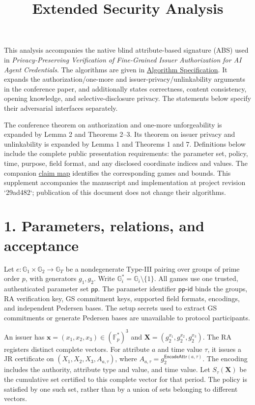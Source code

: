 \documentclass[11pt]{article}
\title{Extended Security Analysis}
\author{}
\date{}
\begin{document}
\maketitle


This analysis accompanies the native blind attribute-based signature (ABS) used in \emph{Privacy-Preserving Verification of Fine-Grained Issuer Authorization for AI Agent Credentials}. The algorithms are given in \href{algorithm-specification.md}{Algorithm Specification}. It expands the authorization/one-more and issuer-privacy/unlinkability arguments in the conference paper, and additionally states correctness, content consistency, opening knowledge, and selective-disclosure privacy. The statements below specify their adversarial interfaces separately.

The conference theorem on authorization and one-more unforgeability is expanded by Lemma 2 and Theorems 2–3. Its theorem on issuer privacy and unlinkability is expanded by Lemma 1 and Theorems 1 and 7. Definitions below include the complete public presentation requirements: the parameter set, policy, time, purpose, field format, and any disclosed coordinate indices and values. The companion \href{security-claim-map.md}{claim map} identifies the corresponding games and bounds. This supplement accompanies the manuscript and implementation at project revision `29ad482`; publication of this document does not change their algorithms.

\section*{1. Parameters, relations, and acceptance}


Let \(e:\mathbb G_1\times\mathbb G_2\to\mathbb G_T\) be a nondegenerate Type-III pairing over groups of prime order \(p\), with generators \(g_1,g_2\). Write \(\mathbb G_i^*=\mathbb G_i\setminus\{1\}\). All games use one trusted, authenticated parameter set \(\mathsf{pp}\). The parameter identifier \(\mathsf{pp\text{-}id}\) binds the groups, RA verification key, GS commitment keys, supported field formats, encodings, and independent Pedersen bases. The setup secrets used to extract GS commitments or generate Pedersen bases are unavailable to protocol participants.

An issuer has \(\boldsymbol x=(x_1,x_2,x_3)\in(\mathbb F_p^*)^3\) and \(\boldsymbol X=(g_2^{x_1},g_2^{x_2},g_2^{x_3})\). The RA registers distinct complete vectors. For attribute \(a\) and time value \(\tau\), it issues a JR certificate on \((X_1,X_2,X_3,A_{a,\tau})\), where \(A_{a,\tau}=g_2^{\mathsf{EncodeAttr}(a,\tau)}\). The encoding includes the authority, attribute type and value, and time value. Let \(S_\tau(\boldsymbol X)\) be the cumulative set certified to this complete vector for that period. The policy is satisfied by one such set, rather than by a union of sets belonging to different vectors.
\end{document}
